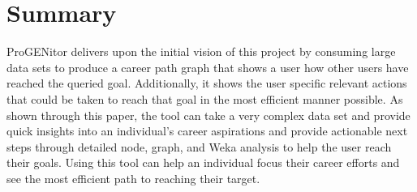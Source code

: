 \section{Summary}
\label{sect:summary}
ProGENitor delivers upon the initial vision of this project by consuming large
data sets to produce a career path graph that shows a user how other users
have reached the queried goal.  Additionally, it shows the user specific relevant actions
that could be taken to reach that goal in the most efficient manner possible.  As
shown through this paper, the tool can take a very complex data set and
provide quick insights into an individual's career aspirations and provide
actionable next steps through detailed node, graph, and Weka analysis to help
the user reach their goals.  Using this tool can help an individual focus their
career efforts and see the most efficient path to reaching their target.
